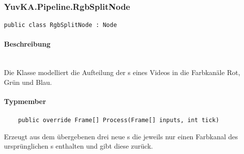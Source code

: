\subsubsection{YuvKA.Pipeline.RgbSplitNode}

\begin{verbatim}
public class RgbSplitNode : Node
\end{verbatim}

\paragraph{Beschreibung}~\\
Die Klasse  modelliert die Aufteilung der s eines Videos in die Farbkanäle Rot, Grün und Blau.

\paragraph{Typmember}
\begin{itemize}

	\begin{verbatim}
	public override Frame[] Process(Frame[] inputs, int tick)
	\end{verbatim}
	Erzeugt aus dem übergebenen  drei neue s die jeweils nur einen Farbkanal des ursprünglichen s enthalten und gibt diese zurück.
	
\end{itemize}
